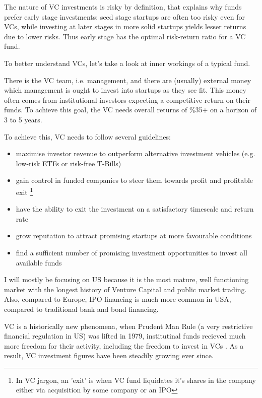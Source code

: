 The nature of VC investments is risky by definition, that explains why funds prefer early stage investments: seed stage startups are often too risky even for VCs, while investing at later stages in more solid startups yields lesser returns due to lower risks. Thus early stage has the optimal risk-return ratio for a VC fund.

To better understand VCs, let's take a look at inner workings of a typical fund.

There is the VC team, i.e. management, and there are (usually) external money which management is ought to invest into startups as they see fit. This money often comes from institutional investors expecting a competitive return on their funds. To achieve this goal, the VC needs overall returns of \%35+ on a horizon of 3 to 5 years.

To achieve this, VC needs to follow several guidelines:
\begin{itemize}
    \item maximise investor revenue to outperform alternative investment vehicles (e.g. low-risk ETFs or risk-free T-Bills)
    \item gain control in funded companies to steer them towards profit and profitable exit \footnote{In VC jargon, an 'exit' is when VC fund liquidates it's shares in the company either via acquisition by some company or an IPO}
    \item have the ability to exit the investment on a satisfactory timescale and return rate
    \item grow reputation to attract promising startups at more favourable conditions
    \item find a sufficient number of promising investment opportunities to invest all available funds
    
\end{itemize}

I will mostly be focusing on US because it is the most mature, well functioning market with the longest history of Venture Capital and public market trading. Also, compared to Europe, IPO financing is much more common in USA, compared to traditional bank and bond financing.

VC is a historically new phenomena, when Prudent Man Rule (a very restrictive financial regulation in US) was lifted in 1979, institutinal funds recieved much more freedom for their activity, including the freedom to invest in VCs \parencite{poterba:1989}. As a result, VC investment figures have been steadily growing ever since.

